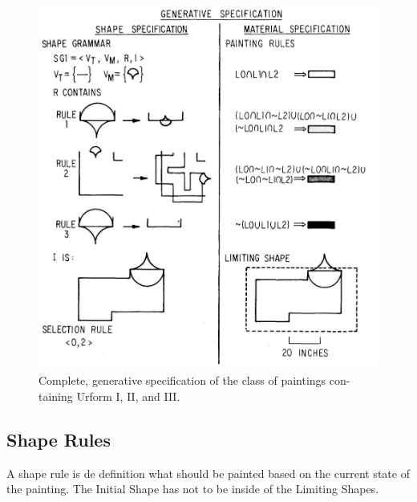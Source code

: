 \documentclass[11pt, a4paper]{report}
\begin{document}
\begin{displayquote}
\begin{figure}[!h]
    \centering
        \includegraphics{generativ_specification}
    \caption{ Complete, generative specification of the class of  paintings con-
        taining Urform I, II,  and  III. \citep{shapeGrammars:1972}}
\end{figure}
\end{displayquote}

\subsection{Shape Rules}
A shape rule is de definition what should be painted based on the current state of the painting. The Initial Shape has not to be inside of the Limiting Shapes.

\pagebreak
\end{document}

